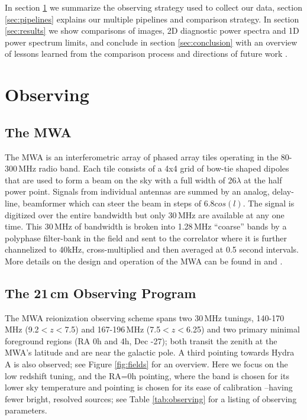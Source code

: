 \documentclass[twolcolumn,iop]{emulateapj}
\begin{document}
In section \ref{sec:observing} we summarize the observing strategy used to collect our data, section \ref{sec:pipelines} explains our multiple pipelines and comparison strategy. In section \ref{sec:results} we show comparisons of images, 2D diagnostic power spectra and 1D power spectrum limits, and conclude in section \ref{sec:conclusion} with an overview of lessons learned from the comparison process and directions of future work .



\section{Observing}
\label{sec:observing}
\subsection{The MWA}
The MWA is an interferometric array of phased array tiles operating in the 80-300\,MHz radio band. Each tile consists of a 4x4 grid of bow-tie shaped dipoles that are used to form a beam on the sky with a full width of 26\arcdeg$\lambda$ at the half power point. Signals from individual antennas are summed by an analog, delay-line, beamformer which can steer the beam in steps of 6.8\arcdeg$cos(l)$.  The signal is digitized over the entire bandwidth but only 30\,MHz are available at any one time.  This 30\,MHz of bandwidth is broken into 1.28\,MHz ``coarse'' bands by a polyphase filter-bank in the field and sent to the correlator \citep{Ord:2015PASA...32....6O} where it is further channelized to 40kHz, cross-multiplied and then averaged at 0.5 second intervals.  More details on the design and operation of the MWA can be found in \cite{Lonsdale:2009p7913} and \cite{Tingay:2013p9022}.

\subsection{The 21\,cm Observing Program}
The MWA reionization observing scheme spans two 30\,MHz tunings, 140-170\,MHz (9.2$<z<$7.5) and 167-196\,MHz (7.5$<z<$6.25) and two primary minimal foreground regions (RA 0h and 4h, Dec -27\arcdeg); both transit the zenith at the MWA's  latitude and are near the galactic pole. A third pointing towards Hydra A is also observed; see Figure \ref{fig:fields} for an overview. Here we focus on the low redshift tuning, and the RA=0h pointing, where the band is chosen for its lower sky temperature and pointing is chosen for its ease of calibration --having fewer bright, resolved sources; see Table \ref{tab:observing} for a listing of observing parameters.
\end{document}
